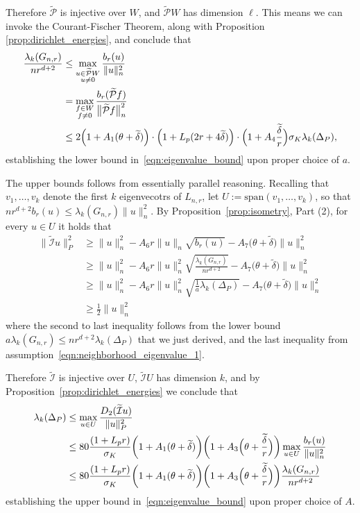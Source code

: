 \documentclass[twoside]{article}
\newcommand{\1}{\mathbf{1}}
\newcommand{\Lap}{L}
\newcommand{\mc}[1]{\mathcal{#1}}
\newcommand{\wt}[1]{\widetilde{#1}}
\theoremstyle{definition}
\theoremstyle{remark}
\begin{document}
Therefore $\wt{\mc{P}}$ is injective over $W$, and $\wt{\mc{P}}W$ has dimension $\ell$. This means we can invoke the Courant-Fischer Theorem, along with Proposition \ref{prop:dirichlet_energies}, and conclude that
\begin{align*}
\frac{\lambda_k(G_{n,r})}{nr^{d + 2}} & \leq \max_{\substack{u \in \wt{\mc{P}}W \\ u \neq 0} } \frac{b_r(u)}{\|u\|_{n}^2} \\
& = \max_{\substack{f \in W \\ f \neq 0} } \frac{b_r(\wt{\mc{P}}f)}{\bigl\|\wt{\mc{P}}f\bigr\|_{n}^2} \\
& \leq 2\Bigl(1 + A_1(\theta + \wt{\delta})\Bigr) \cdot \Bigl(1 + L_p(2r + 4\wt{\delta})\Bigr) \cdot \Bigl(1 + A_4\frac{\wt{\delta}}{r}\Bigr)\sigma_K \lambda_{k}(\Delta_P),
\end{align*}
establishing the lower bound in~\eqref{eqn:eigenvalue_bound} upon proper choice of $a$.

The upper bounds follows from essentially parallel reasoning. Recalling that $v_1,\ldots,v_k$ denote the first $k$ eigenvecotrs of $\Lap_{n,r}$, let $U := \mathrm{span}(v_1,\ldots,v_k)$, so that $nr^{d + 2} b_r(u) \leq \lambda_k(G_{n,r}) \|u\|_n^2$. By Proposition~\ref{prop:isometry}, Part (2), for every $u \in U$ it holds that
\begin{align*}
\bigl\|\wt{\mc{I}}u\bigr\|_{P}^2 & \geq \|u\|_n^2 - A_6 r \|u\|_n \sqrt{b_r(u)} - A_7\bigl(\theta + \wt{\delta}\bigr)\|u\|_n^2 \\
& \geq \|u\|_n^2 - A_6 r \|u\|_n^2 \sqrt{\frac{\lambda_{k}(G_{n,r})}{nr^{d + 2}}} - A_7\bigl(\theta + \wt{\delta}\bigr)\|u\|_n^2 \\
& \geq \|u\|_n^2 - A_6 r \|u\|_n^2 \sqrt{\frac{1}{a}\lambda_k(\Delta_P)} - A_7\bigl(\theta + \wt{\delta}\bigr)\|u\|_n^2 \\
& \geq \frac{1}{2}\|u\|_n^2
\end{align*}
where the second to last inequality follows from the lower bound $a \lambda_k(G_{n,r}) \leq nr^{d + 2}\lambda_k(\Delta_P)$ that we just derived, and the last inequality from assumption~\eqref{eqn:neighborhood_eigenvalue_1}.

Therefore $\wt{\mc{I}}$ is injective over $U$, $\wt{\mc{I}}U$ has dimension $k$, and by Proposition~\ref{prop:dirichlet_energies} we conclude that
\begin{align*}
\lambda_k(\Delta_P) & \leq \max_{u \in U} \frac{D_2(\wt{\mc{I}}u)}{\|u\|_P^2} \\
& \leq 80\frac{(1 + L_pr)}{\sigma_K}\biggl(1 + A_1(\theta + \wt{\delta})\biggr) \biggl(1 + A_3\Bigl(\theta + \frac{\wt{\delta}}{r}\Bigr)\biggr)\max_{u \in U} \frac{b_r(u)}{\|u\|_n^2} \\
& \leq 80\frac{(1 + L_pr)}{\sigma_K}\biggl(1 + A_1(\theta + \wt{\delta})\biggr) \biggl(1 + A_3\Bigl(\theta + \frac{\wt{\delta}}{r}\Bigr)\biggr) \frac{\lambda_k(G_{n,r})}{nr^{d + 2}}
\end{align*}
establishing the upper bound in~\eqref{eqn:eigenvalue_bound} upon proper choice of $A$.
\end{document}
